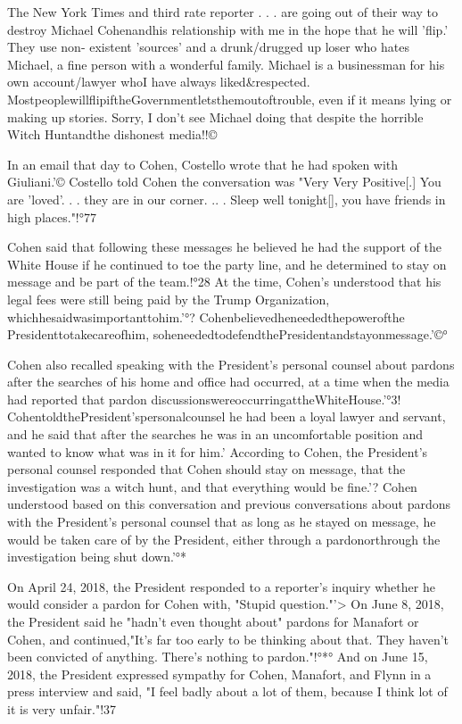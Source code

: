The New York Times and third rate reporter . . . are going out of their way to destroy Michael Cohenandhis relationship with me in the hope that he will 'flip.'
They use non- existent 'sources' and a drunk/drugged up loser who hates Michael, a fine person with a wonderful family.
Michael is a businessman for his own account/lawyer whoI have always liked&respected.
MostpeoplewillflipiftheGovernmentletsthemoutoftrouble, even if it means lying or making up stories.
Sorry, I don't see Michael doing that despite the horrible Witch Huntandthe dishonest media!!©%

In an email that day to Cohen, Costello wrote that he had spoken with Giuliani.'© Costello told Cohen the conversation was "Very Very Positive[.] You are 'loved'. . . they are in our corner. .. . Sleep well tonight[], you have friends in high places."!°77

Cohen said that following these messages he believed he had the support of the White House if he continued to toe the party line, and he determined to stay on message and be part of the team.!°28
At the time, Cohen's understood that his legal fees were still being paid by the Trump Organization, whichhesaidwasimportanttohim.'°?
Cohenbelievedheneededthepowerofthe Presidenttotakecareofhim, soheneededtodefendthePresidentandstayonmessage.'©°

Cohen also recalled speaking with the President's personal counsel about pardons after the searches of his home and office had occurred, at a time when the media had reported that pardon discussionswereoccurringattheWhiteHouse.'°3!
CohentoldthePresident'spersonalcounsel he had been a loyal lawyer and servant, and he said that after the searches he was in an uncomfortable position and wanted to know what was in it for him.'%
According to Cohen, the President's personal counsel responded that Cohen should stay on message, that the investigation was a witch hunt, and that everything would be fine.'?
Cohen understood based on this conversation and previous conversations about pardons with the President's personal counsel that as long as he stayed on message, he would be taken care of by the President, either through a pardonorthrough the investigation being shut down.'°*

On April 24, 2018, the President responded to a reporter's inquiry whether he would consider a pardon for Cohen with, "Stupid question."'>
On June 8, 2018, the President said he "hadn't even thought about" pardons for Manafort or Cohen, and continued,"It's far too early to be thinking about that.
They haven't been convicted of anything.
There's nothing to pardon."!°*°
And on June 15, 2018, the President expressed sympathy for Cohen, Manafort, and Flynn in a press interview and said, "I feel badly about a lot of them, because I think lot of it is very unfair."!37

